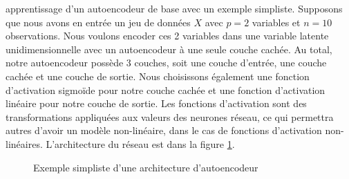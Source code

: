 \DIFdelbegin {}\DIFdelend \DIFaddbegin {}\DIFaddend apprentissage d'un autoencodeur de base avec un exemple simpliste. Supposons que nous avons en entrée un jeu de données $X$ avec $p=2$ variables et $n=10$ observations. Nous voulons encoder ces 2 variables dans une variable latente unidimensionnelle avec un autoencodeur à une seule couche cachée. Au total, notre autoencodeur possède 3 couches, soit une couche d'entrée, une couche cachée et une couche de sortie. Nous choisissons également une fonction d'activation sigmoïde pour notre couche cachée et une fonction d'activation linéaire pour notre couche de sortie. Les fonctions d'activation sont des transformations appliquées aux valeurs des neurones \DIFdelbegin {}\DIFdelend \DIFaddbegin {}\DIFaddend réseau, ce qui permettra \DIFdelbegin {}\DIFdelend \DIFaddbegin {}\DIFaddend autres d'avoir un modèle non-linéaire, dans le cas de fonctions d'activation non-linéaires. L'architecture du réseau est \DIFdelbegin {}\DIFdelend \DIFaddbegin {}\DIFaddend dans la figure \ref{fig:toyAE}.

\begin{figure}[htb]
	\centering
	\caption{Exemple simpliste d'une architecture d'autoencodeur}
	\label{fig:toyAE}
\end{figure}

